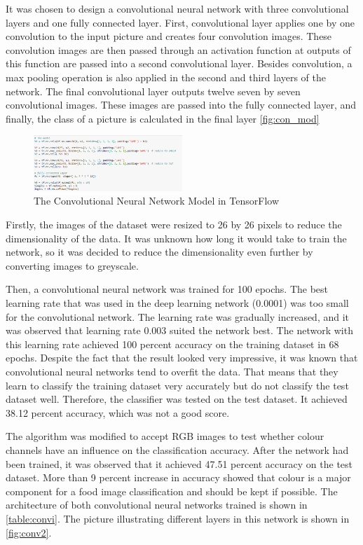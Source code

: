 It was chosen to design a convolutional neural network with three convolutional layers and one fully connected layer. First, convolutional layer applies one by one convolution to the input picture and creates four convolution images. These convolution images are then passed through an activation function at outputs of this function are passed into a second convolutional layer. Besides convolution, a max pooling operation is also applied in the second and third layers of the network. The final convolutional layer outputs twelve seven by seven convolutional images. These images are passed into the fully connected layer, and finally, the class of a picture is calculated in the final layer \autoref{fig:con_mod}



\begin{figure}[h]
\centering
\includegraphics[width=0.5\textwidth]{Figures/4/conv.PNG}
\caption{The Convolutional Neural Network Model in TensorFlow}
\label{fig:con_mod}
\end{figure}

Firstly, the images of the dataset were resized to 26 by 26 pixels to reduce the dimensionality of the data.
It was unknown how long it would take to train the network, so it was decided to reduce the dimensionality even further by converting images to greyscale.

Then, a convolutional neural network was trained for 100 epochs. The best learning rate that was used in the deep learning network (0.0001) was too small for the convolutional network. The learning rate was gradually increased, and it was observed that learning rate 0.003 suited the network best. The network with this learning rate achieved 100 percent accuracy on the training dataset in 68 epochs. Despite the fact that the result looked very impressive, it was known that convolutional neural networks tend to overfit the data. That means that they learn to classify the training dataset very accurately but do not classify the test dataset well. Therefore, the classifier was tested on the test dataset. It achieved 38.12 percent accuracy, which was not a  good score.

The algorithm was modified to accept RGB images to test whether colour channels have an influence on the classification accuracy. After the network had been trained, it was observed that it achieved 47.51 percent accuracy on the test dataset. More than 9 percent increase in accuracy showed that colour is a major component for a food image classification and should be kept if possible. The architecture of both convolutional neural networks trained is shown in \autoref{table:convi}. The picture illustrating different layers in this network is shown in \autoref{fig:conv2}.

